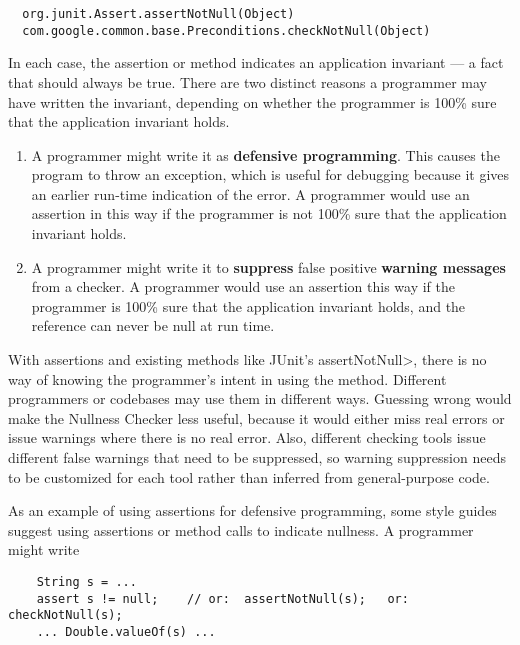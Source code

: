 \begin{Verbatim}
  org.junit.Assert.assertNotNull(Object)
  com.google.common.base.Preconditions.checkNotNull(Object)
\end{Verbatim}

In each case, the assertion or method indicates an application invariant --- a
fact that should always be true.  There are two distinct reasons a
programmer may have written the invariant, depending on whether the
programmer is 100\% sure that the application invariant holds.

\begin{enumerate}
\item
  A programmer might write it as \textbf{defensive programming}.  This causes
  the program to throw an exception, which is useful for debugging because
  it gives an earlier run-time indication of the error.
  A programmer would use an assertion in this way if the programmer is not
  100\% sure that the application invariant holds.


\item
  A programmer might write it to \textbf{suppress} false positive
  \textbf{warning messages} from a checker.  A programmer would use an
  assertion this way if the programmer is 100\% sure that the application
  invariant holds, and the reference can never be null at run time.

\end{enumerate}

With assertions and existing methods like JUnit's \<assertNotNull>, there
is no way of knowing the programmer's intent in using the method.
Different programmers or codebases may use them in different ways.
Guessing wrong would make the Nullness Checker less useful, because it
would either miss real errors or issue warnings where there is no real
error.  Also, different checking tools issue different false warnings that
need to be suppressed, so warning suppression needs to be customized for
each tool rather than inferred from general-purpose code.


As an example of using assertions for defensive programming, some style
guides suggest using assertions or method calls to indicate nullness.  A
programmer might write

\begin{Verbatim}
    String s = ...
    assert s != null;    // or:  assertNotNull(s);   or: checkNotNull(s);
    ... Double.valueOf(s) ...
\end{Verbatim}

